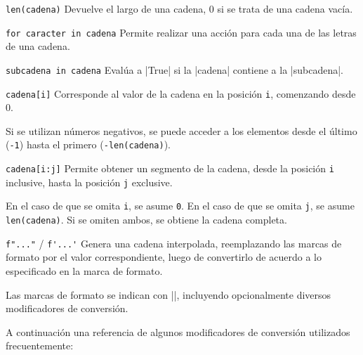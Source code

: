 \begin{referencia_python}

\begin{sintaxis}{\lstinline!len(cadena)!}
Devuelve el largo de una cadena, 0 si se trata de una cadena vacía.
\end{sintaxis}

\begin{sintaxis}{\lstinline!for caracter in cadena!}
Permite realizar una acción para cada una de las letras de una cadena.
\end{sintaxis}

\begin{sintaxis}{\lstinline!subcadena in cadena!}
Evalúa a |True| si la |cadena| contiene a la |subcadena|.
\end{sintaxis}

\begin{sintaxis}{\lstinline!cadena[i]!}
Corresponde al valor de la cadena en la posición \lstinline!i!, comenzando
desde 0.

Si se utilizan números negativos, se puede acceder a los
elementos desde el último (\lstinline!-1!) hasta el primero
(\lstinline!-len(cadena)!).
\end{sintaxis}

\begin{sintaxis}{\lstinline!cadena[i:j]!}
Permite obtener un segmento de la cadena, desde la posición \lstinline!i!
inclusive, hasta la posición \lstinline!j! exclusive.

En el caso de que se omita \lstinline!i!, se asume \lstinline!0!.  En el
caso de que se omita \lstinline!j!, se asume \lstinline!len(cadena)!.  Si
se omiten ambos, se obtiene la cadena completa.
\end{sintaxis}

\begin{sintaxis}{\lstinline!f"..."! / \lstinline!f'...'!}
Genera una cadena interpolada, reemplazando las marcas de formato por el valor
correspondiente, luego de convertirlo de acuerdo a lo especificado en la
marca de formato.

Las marcas de formato se indican con |{}|, incluyendo opcionalmente
diversos modificadores de conversión.

A continuación una referencia de algunos modificadores de conversión utilizados
frecuentemente:


\end{sintaxis}
\end{referencia_python}
